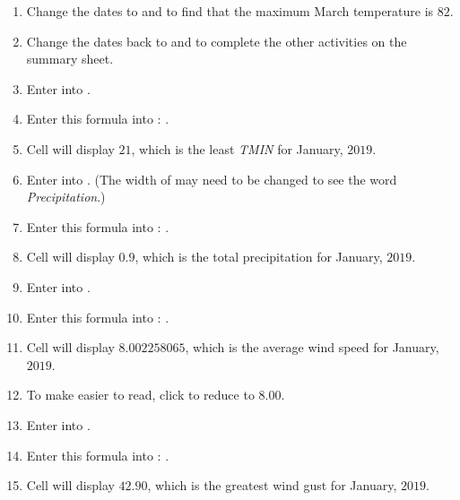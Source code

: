 \begin{enumerate}[resume]
	\item Change the dates to  and  to find that the maximum March temperature is $ 82 $.
	\item Change the dates back to  and  to complete the other activities on the summary sheet.

	\item Enter  into .
	\item Enter this formula into : .
	\item Cell  will display $ 21 $, which is the least \textit{TMIN} for January, $ 2019 $.

	\item Enter  into .  (The width of  may need to be changed to see the word \textit{Precipitation}.)
	\item Enter this formula into : .
	\item Cell  will display $ 0.9 $, which is the total precipitation for January, $ 2019 $.

	\item Enter  into .
	\item Enter this formula into : .
	\item Cell  will display $ 8.002258065 $, which is the average wind speed for January, $ 2019 $.
	\item To make  easier to read, click  to reduce  to $ 8.00 $.

	\item Enter  into .
	\item Enter this formula into : .
	\item Cell  will display $ 42.90 $, which is the greatest wind gust for January, $ 2019 $.


\end{enumerate}
